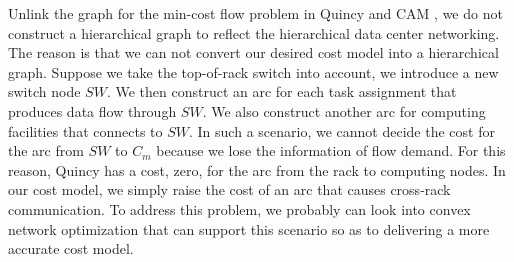 Unlink the graph for the min-cost flow problem in Quincy \cite{IsardM2009_Quincy} and CAM \cite{LiM2012_CAM}, we do not construct a hierarchical graph to reflect the hierarchical data center networking.
The reason is that we can not convert our desired cost model into a hierarchical graph.
Suppose we take the top-of-rack switch into account, we introduce a new switch node $SW$.
We then construct an arc for each task assignment that produces data flow through $SW$.
We also construct another arc for computing facilities that connects to $SW$.
In such a scenario, we cannot decide the cost for the arc from $SW$ to $C_{m}$ because we lose the information of flow demand.
For this reason, Quincy has a cost, zero, for the arc from the rack to computing nodes.
In our cost model, we simply raise the cost of an arc that causes cross-rack communication.
To address this problem, we probably can look into convex network optimization that can support this scenario so as to delivering a more accurate cost model.
